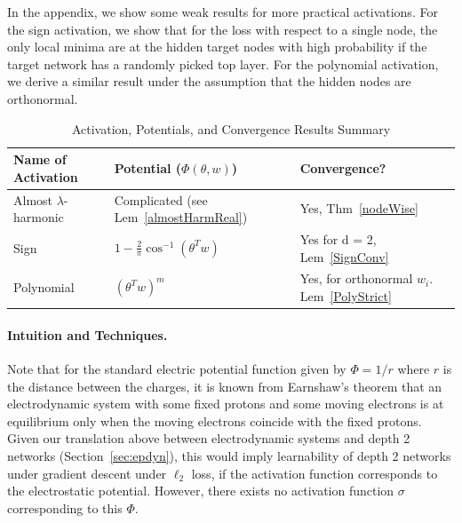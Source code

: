 In the appendix, we show some weak results for more practical activations. For the sign activation, we show that for the loss with respect to a single node, the only local minima are at the hidden target nodes with high probability if the target network has a randomly picked top layer. For the polynomial activation, we derive a similar result under the assumption that the hidden nodes are orthonormal.


 \begin{table}[h!]
 \noindent
 \vskip 0.1in
 \begin{center}
 \begin{small}
 \begin{sc}
 \begin{tabular}{
   |p{}%
   |p{}%
   |p{}|%
   }
    \hline 
         Name of Activation&  Potential  ($\Phi(\theta,w)$)    & Convergence? \\ \hline 
        Almost   $\lambda$-harmonic  & Complicated  (see Lem~\ref{almostHarmReal}) & Yes, Thm~\ref{nodeWise}\\
         Sign & $1 - \frac{2}{\pi}\cos^{-1}(\theta^Tw)$       & Yes for d = 2, Lem~\ref{SignConv} \\   
Polynomial  & $(\theta^Tw)^m$       & Yes, for orthonormal $w_i.$ Lem~\ref{PolyStrict}  \\        
         \hline
 \end{tabular}
 \end{sc}
 \end{small}
 \end{center}
 \caption{Activation, Potentials, and Convergence Results Summary}
 \label{table1}
 \end{table} 

\paragraph{Intuition and Techniques.}
%
Note that for the standard electric potential function given by $\Phi = 1/r$ where $r$ is the distance between the charges, it is known from Earnshaw's theorem that an electrodynamic system with some fixed protons and some moving electrons is at equilibrium only when the moving electrons coincide with the fixed protons. Given our translation above between electrodynamic systems and depth 2 networks (Section~\ref{sec:epdyn}), this would imply learnability of depth 2 networks under gradient descent under $\ell_2$ loss, if the activation function corresponds to the electrostatic potential. However, there exists no activation function $\sigma$ corresponding to this $\Phi$.
%

